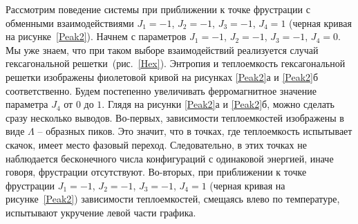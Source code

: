\documentclass[utf8,12pt]{jetp}
\begin{document}
Рассмотрим поведение системы при приближении к точке фрустрации с обменными взаимодействиями $J_1 = -1$, $J_2 = -1$, $J_3 = -1$, $J_4 = 1$ (черная кривая на рисунке~\ref{Peak2}). Начнем с параметров $J_1 = -1$, $J_2 = -1$, $J_3 = -1$, $J_4 = 0$. Мы уже знаем, что при таком выборе взаимодействий реализуется случай гексагональной решетки~(рис.~\ref{Hex}). Энтропия и теплоемкость гексагональной решетки изображены фиолетовой кривой на рисунках \ref{Peak2}а и \ref{Peak2}б соответственно. Будем постепенно увеличивать ферромагнитное значение параметра $J_4$ от $0$ до $1$. Глядя на рисунки \ref{Peak2}а и \ref{Peak2}б, можно сделать сразу несколько выводов. Во-первых, зависимости теплоемкостей изображены в виде $\Lambda$ -- образных пиков. Это значит, что в точках, где теплоемкость испытывает скачок, имеет место фазовый переход. Следовательно, в этих точках не наблюдается бесконечного числа конфигураций с одинаковой энергией, иначе говоря, фрустрации отсутствуют. Во-вторых, при приближении к точке фрустрации $J_1 = -1$, $J_2 = -1$, $J_3 = -1$, $J_4 = 1$ (черная кривая на рисунке~\ref{Peak2}) зависимости теплоемкостей, смещаясь влево по температуре, испытывают укручение левой части графика.
\end{document}
